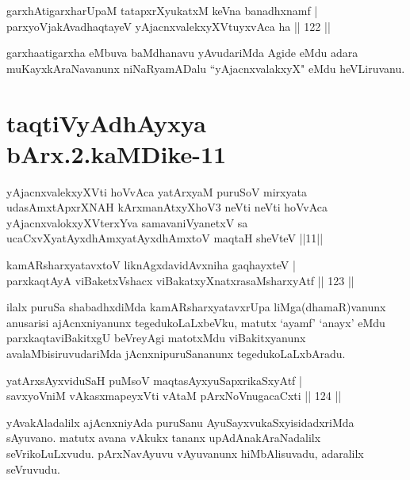 
\begin{shl}
garxhAtigarxharUpaM tatapxrXyukatxM keVna banadhxnamf |\\
parxyoVjakAvadhaqtayeV yAjacnxvalekxyXVtuyxvAca ha \hfill || 122 ||
\end{shl}

\begin{artha}
garxhaatigarxha eMbuva baMdhanavu yAvudariMda Agide eMdu adara muKayxkAraNavanunx niNaRyamADalu ``yAjacnxvalakxyX" eMdu heVLiruvanu.
\end{artha}

\section*{taqtiVyAdhAyxya bArx.2.kaMDike-11}

\begin{shl}
yAjacnxvalekxyXVti hoVvAca yatArxyaM puruSoV mirxyata udasAmxtApxrXNAH kArxmanAtxyXhoV3 neVti neVti hoVvAca yAjacnxvalokxyXV\s terxYva samavaniVyanetxV sa ucaCxvXyatAyxdhAmxyatAyxdhAmxtoV maqtaH sheVteV ||11||
\end{shl}

\begin{shl}
kamARsharxyatavxtoV liknAgxdavidAvxniha gaqhayxteV |\\
parxkaqtAyA viBaketxVshacx viBakatxyXnatxrasaMsharxyAtf \hfill || 123 ||
\end{shl}

\begin{artha}
ilalx puruSa shabadhxdiMda kamARsharxyatavxrUpa liMga(dhamaR)vanunx anusarisi ajAcnxniyanunx tegedukoLaLxbeVku, matutx `ayamf' `anayx' eMdu parxkaqtaviBakitxgU beVreyAgi matotxMdu viBakitxyanunx avalaMbisiruvudariMda jAcnxnipuruSananunx tegedukoLaLxbAradu.
\end{artha}

\begin{shl}
yatArxsAyxviduSaH puMsoV maqtasAyx\s \s yuSapxrikaSxyAtf |\\
savxyoVniM vAkasxmapeyxVti vAtaM pArxNoV\s nugacaCxti \hfill || 124 ||
\end{shl}

\begin{artha}
yAvakAladalilx ajAcnxniyAda puruSanu AyuSayxvukaSxyisidadxriMda sAyuvano. matutx avana vAkukx tananx upAdAnakAraNadalilx seVrikoLuLxvudu. pArxNavAyuvu vAyuvanunx hiMbAlisuvadu, adaralilx seVruvudu.
\end{artha}


